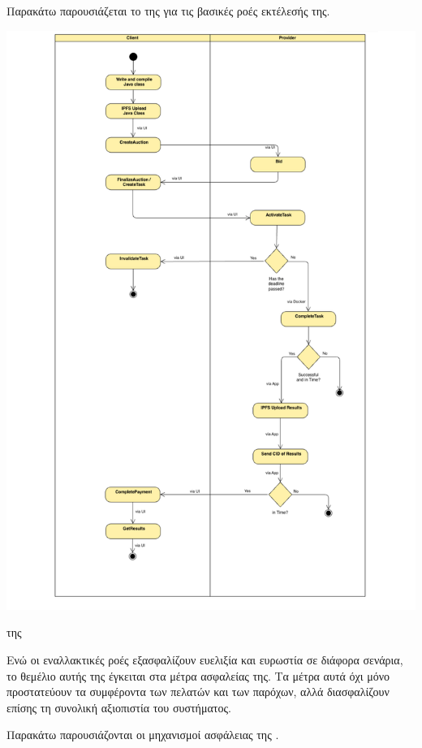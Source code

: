 Παρακάτω παρουσιάζεται το  της  για τις βασικές ροές εκτέλεσής της.
\begin{illustration}
    \centering
    \includegraphics[width=1.1\textwidth]{figures/figure-005.pdf}
    \caption{ της } 
\end{illustration}

\newpage
Ενώ οι εναλλακτικές ροές εξασφαλίζουν ευελιξία και ευρωστία σε διάφορα σενάρια, το θεμέλιο αυτής της  έγκειται στα μέτρα ασφαλείας της. Τα μέτρα αυτά όχι μόνο προστατεύουν τα συμφέροντα των πελατών και των παρόχων, αλλά διασφαλίζουν επίσης τη συνολική αξιοπιστία του συστήματος. 

Παρακάτω παρουσιάζονται οι μηχανισμοί ασφάλειας της .


